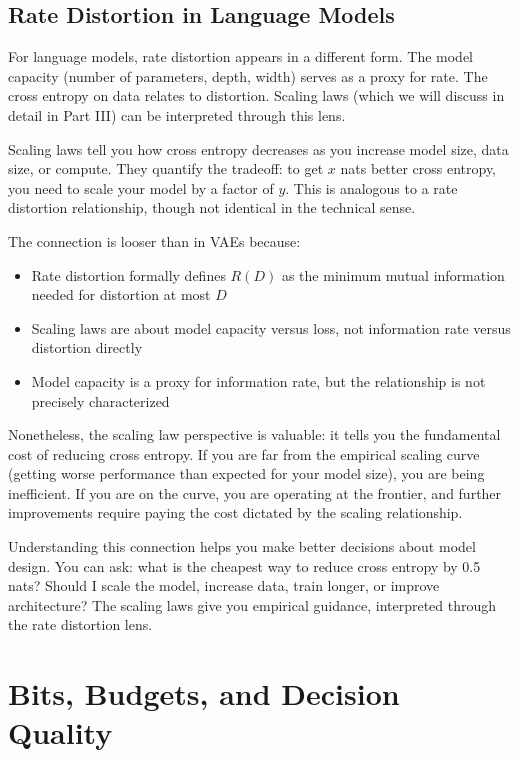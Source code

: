 \subsection{Rate Distortion in Language Models}

For language models, rate distortion appears in a different form. The model capacity (number of parameters, depth, width) serves as a proxy for rate. The cross entropy on data relates to distortion. Scaling laws (which we will discuss in detail in Part III) can be interpreted through this lens.

Scaling laws tell you how cross entropy decreases as you increase model size, data size, or compute. They quantify the tradeoff: to get $x$ nats better cross entropy, you need to scale your model by a factor of $y$. This is analogous to a rate distortion relationship, though not identical in the technical sense.

The connection is looser than in VAEs because:

\begin{itemize}
\item Rate distortion formally defines $R(D)$ as the minimum mutual information needed for distortion at most $D$
\item Scaling laws are about model capacity versus loss, not information rate versus distortion directly
\item Model capacity is a proxy for information rate, but the relationship is not precisely characterized
\end{itemize}

Nonetheless, the scaling law perspective is valuable: it tells you the fundamental cost of reducing cross entropy. If you are far from the empirical scaling curve (getting worse performance than expected for your model size), you are being inefficient. If you are on the curve, you are operating at the frontier, and further improvements require paying the cost dictated by the scaling relationship.

Understanding this connection helps you make better decisions about model design. You can ask: what is the cheapest way to reduce cross entropy by 0.5 nats? Should I scale the model, increase data, train longer, or improve architecture? The scaling laws give you empirical guidance, interpreted through the rate distortion lens.

\vspace{2em}

\section{Bits, Budgets, and Decision Quality}

